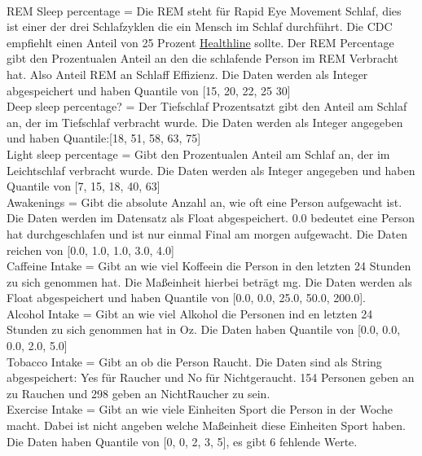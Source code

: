 \documentclass[usegeometry=true]{scrartcl}
\begin{document}
\\ REM Sleep percentage = Die REM steht für Rapid Eye Movement Schlaf, dies ist einer der drei Schlafzyklen die ein Mensch im Schlaf durchführt. Die CDC empfiehlt einen Anteil von 25 Prozent  \href{https://www.healthline.com/health/how-much-deep-sleep-do-you-need}{Healthline} sollte.  Der REM Percentage gibt den Prozentualen Anteil an den die schlafende Person im REM Verbracht hat. Also Anteil REM an Schlaff Effizienz. Die Daten werden als Integer abgespeichert und haben Quantile von [15, 20, 22, 25 30]
\\ Deep sleep percentage? = Der Tiefschlaf Prozentsatzt gibt den  Anteil am Schlaf an, der im Tiefschlaf verbracht wurde. Die Daten werden als Integer angegeben und haben Quantile:[18, 51, 58, 63, 75] 
\\ Light sleep percentage = Gibt den Prozentualen Anteil am Schlaf an, der im Leichtschlaf verbracht wurde. Die Daten werden als Integer angegeben und haben Quantile von [7, 15, 18, 40, 63]
\\ Awakenings = Gibt die absolute Anzahl an, wie oft eine Person aufgewacht ist. Die Daten werden im Datensatz als Float abgespeichert. 0.0 bedeutet eine Person hat durchgeschlafen und ist nur einmal Final am morgen aufgewacht. Die Daten reichen von  [0.0, 1.0, 1.0, 3.0, 4.0]
\\ Caffeine Intake = Gibt an wie viel Koffeein die Person in den letzten 24 Stunden zu sich genommen hat. Die Maßeinheit hierbei beträgt mg. Die Daten werden als Float abgespeichert und haben Quantile von  [0.0, 0.0, 25.0, 50.0, 200.0].
\\ Alcohol Intake = Gibt an wie viel Alkohol die Personen ind en letzten 24 Stunden zu sich genommen hat in Oz. Die Daten haben Quantile von [0.0, 0.0, 0.0, 2.0, 5.0]
\\ Tobacco Intake = Gibt an ob die Person Raucht. Die Daten sind als String abgespeichert: Yes für Raucher und No für Nichtgeraucht. 154 Personen geben an zu Rauchen und 298 geben an NichtRaucher zu sein. 
\\ Exercise Intake = Gibt an wie viele Einheiten Sport die Person in der Woche macht. Dabei ist nicht angeben welche Maßeinheit diese Einheiten Sport haben. Die Daten haben Quantile von [0, 0, 2, 3, 5], es gibt 6 fehlende Werte. 
\end{document}
